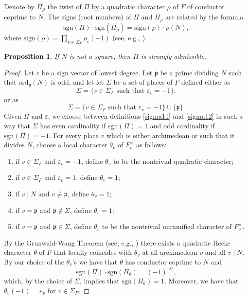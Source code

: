 \documentclass{amsart}
\newtheorem{proposition}[theorem]{Proposition}
\theoremstyle{definition}
\theoremstyle{remark}
\numberwithin{equation}{section}
\newcommand{\sign}{\mathrm{sign}}
\newcommand{\sgn}{\mathrm{sgn}}
\newcommand{\fp}{{\mathfrak{p}}}
\begin{document}
Denote by $\Pi_\rho$ the twist of $\Pi$ by a quadratic character $\rho$ of $F$ of conductor coprime to $N$. The signs (root numbers) of $\Pi$ and $\Pi_\rho$ are related by the formula
\begin{equation}\label{signs}
  \sgn(\Pi) \cdot \sgn(\Pi_\rho) = \sign(\rho)\cdot \rho(N),
\end{equation}
where $\sign(\rho)=\prod_{v\in\Sigma_F}\rho_v(-1)$ (see, e.g., \cite[p. 338]{rohrlich}).


\begin{proposition}\label{strongadm}
If $N$ is not a square, then $\Pi$ is strongly admissible.
\end{proposition}

\begin{proof}
Let $\varepsilon$ be a sign vector of lowest degree. Let $\fp $ be a prime dividing $N$ such that $\mathrm{ord}_\fp(N)$ is odd, and let  let $\Sigma$ be a set of places of $F$ defined either as
  \begin{equation}\label{sigma11}
\Sigma=    \{v\in\Sigma_F \text{ such that } \varepsilon_v = -1\},
  \end{equation}
  or as
  \begin{equation}\label{sigma12}
   \Sigma= \{v\in\Sigma_F \text{ such that } \varepsilon_v = -1\}\cup \{\fp\}.
  \end{equation}
  Given $\Pi$ and $\varepsilon$, we choose between definitions \eqref{sigma11} and \eqref{sigma12} in such a way that $\Sigma$ has even cardinality if $\sgn(\Pi)=1$ and odd cardinality if $\sgn(\Pi)=-1$. For every place $v$ which is either archimedean or such that it divides $N$, choose a local character $\theta_v$ of $F_v^\times$ as follows:
  \begin{enumerate}
  \item if $v\in \Sigma_F$ and  $\varepsilon_v = -1$, define $\theta_v$ to be the nontrivial quadratic character;
  \item  if $v\in\Sigma_F$ and  $\varepsilon_v = 1$, define  $\theta_v=1$;
  \item if $v\mid N$ and $v\neq \fp$, define $\theta_v=1$;
    \item if $v = \fp$ and $\fp\not\in\Sigma$, define $\theta_v = 1$;
  \item if $v=\fp$ and $\fp\in \Sigma$, define $\theta_v$ to be the nontrivial unramified character of $F_v^\times$.
    \end{enumerate}



By the Grunwald-Wang Theorem (see, e.g., \cite[Theorem 2.4]{milneCFT}) there exists a quadratic Hecke character $\theta$ of $F$ that locally coincides with $\theta_v$ at all archimedean $v$ and all  $v\mid N$. By our choice of the $\theta_v$'s we have that $\theta$ has conductor coprime to $N$ and
  \begin{equation*}
    \sgn(\Pi) \cdot \sgn(\Pi_\theta) = (-1)^{|\Sigma|},
  \end{equation*}
which, by the choice of $\Sigma$, implies that $\sgn(\Pi_\theta)=1$. Moreover, we have that $\theta_v(-1) = \varepsilon_v$ for $v\in\Sigma_F$.


\end{proof}
\end{document}
